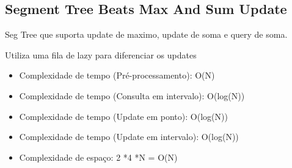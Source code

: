 \documentclass[11pt, a4paper, oneside]{book}
\begin{document}
\hfill

\subsection{Segment Tree Beats Max And Sum Update}


Seg Tree que suporta update de maximo, update de soma e query de soma.

Utiliza uma fila de lazy para diferenciar os updates



\begin{itemize}
\item Complexidade de tempo (Pré-processamento): O(N)
\item Complexidade de tempo (Consulta em intervalo): O(log(N))
\item Complexidade de tempo (Update em ponto): O(log(N))
\item Complexidade de tempo (Update em intervalo): O(log(N))
\item Complexidade de espaço: 2 *4 *N = O(N)
\end{itemize}

\hfill
\end{document}
